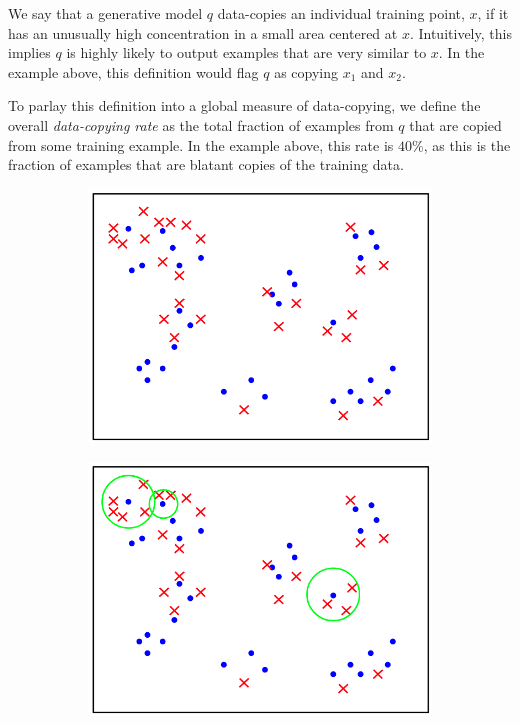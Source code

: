 We say that a generative model $q$  data-copies an individual training point, $x$, if it has an unusually high concentration in a small area centered at $x$. Intuitively, this implies $q$ is highly likely to output examples that are very similar to $x$. In the example above, this definition would flag $q$ as copying $x_1$ and $x_2$. 

To parlay this definition into a global measure of data-copying, we define the overall \textit{data-copying rate} as the total fraction of examples from $q$ that are copied from some training example. In the example above, this rate is $40\%$, as this is the fraction of examples that are blatant copies of the training data.

\begin{figure}[ht]
    \begin{subfigure}{0.31\textwidth}\includegraphics[width=\linewidth]{default.png}
    \end{subfigure}\hspace*{\fill}
	\begin{subfigure}{0.31\textwidth}\includegraphics[width=\linewidth]{add_regions.png}

\end{subfigure}
\end{figure}
